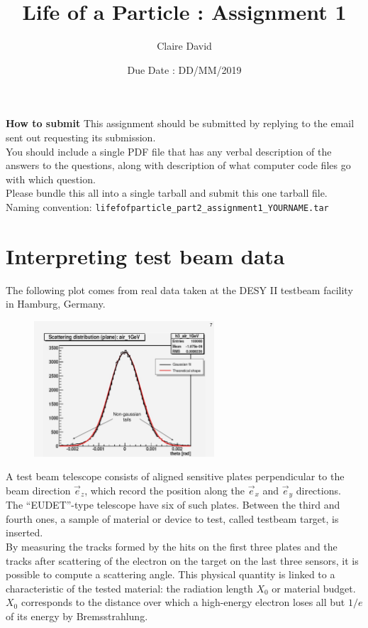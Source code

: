 \documentclass[12pt]{article}
\title{Life of a Particle : Assignment 1}
\author{Claire David}
\date{Due Date : DD/MM/2019}
\begin{document}
\vspace{-2ex}
\maketitle

\textbf{How to submit}
\newline
This assignment should be submitted by replying to the email sent out requesting its submission.\\
You should include a single PDF file that has any verbal description of the answers to the questions, along with description of what computer code files go with which question.\\
Please bundle this all into a single tarball and submit this one tarball file.\\
Naming convention: {\tt{lifefofparticle\_part2\_assignment1\_YOURNAME.tar}}

\section*{Interpreting test beam data}

The following plot comes from real data taken at the DESY II testbeam facility in Hamburg, Germany. 


\begin{figure}[h]
    \centering
    \includegraphics[width=0.6\textwidth]{electron_scattering_DESY_2006.jpg}
\end{figure}

A test beam telescope consists of aligned sensitive plates perpendicular to the beam direction $\vec{e}_z$, which record the position along the $\vec{e}_x$ and $\vec{e}_y$ directions.\\
The ``EUDET''-type telescope have six of such plates. Between the third and fourth ones, a sample of material or device to test, called testbeam target, is inserted.\\
By measuring the tracks formed by the hits on the first three plates and the tracks after scattering of the electron on the 
target on the last three sensors, it is possible to compute a scattering angle. This physical quantity is linked to a characteristic of the tested material: 
the radiation length $X_0$ or material budget. $X_0$ corresponds to the distance over which a high-energy electron loses all but $1/e$ of its energy by Bremsstrahlung.\\
\end{document}
